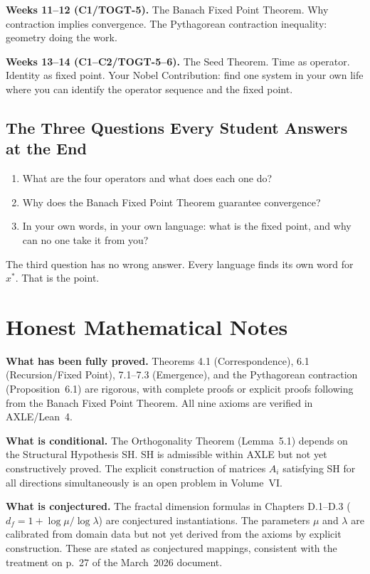 \documentclass[12pt, openright]{book}
\theoremstyle{definition}
\theoremstyle{remark}
\begin{document}
\textbf{Weeks 11--12 (C1/TOGT-5).}
The Banach Fixed Point Theorem. Why contraction implies convergence.
The Pythagorean contraction inequality: geometry doing the work.

\textbf{Weeks 13--14 (C1--C2/TOGT-5--6).}
The Seed Theorem. Time as operator. Identity as fixed point.
Your Nobel Contribution: find one system in your own life
where you can identify the operator sequence and the fixed point.

\section{The Three Questions Every Student Answers at the End}

\begin{enumerate}
\item What are the four operators and what does each one do?
\item Why does the Banach Fixed Point Theorem guarantee convergence?
\item In your own words, in your own language:
what is the fixed point, and why can no one take it from you?
\end{enumerate}

The third question has no wrong answer.
Every language finds its own word for $x^*$.
That is the point.

\backmatter

\chapter*{Honest Mathematical Notes}

\textbf{What has been fully proved.}
Theorems 4.1 (Correspondence), 6.1 (Recursion/Fixed Point),
7.1--7.3 (Emergence), and the Pythagorean contraction
(Proposition~6.1) are rigorous, with complete proofs
or explicit proofs following from the Banach Fixed Point Theorem.
All nine axioms are verified in AXLE/Lean~4.

\textbf{What is conditional.}
The Orthogonality Theorem (Lemma~5.1) depends on the
Structural Hypothesis SH. SH is admissible within AXLE
but not yet constructively proved. The explicit construction
of matrices $A_i$ satisfying SH for all directions simultaneously
is an open problem in Volume~VI.

\textbf{What is conjectured.}
The fractal dimension formulas in Chapters D.1--D.3
($d_f = 1 + \log\mu/\log\lambda$) are conjectured instantiations.
The parameters $\mu$ and $\lambda$ are calibrated from domain data
but not yet derived from the axioms by explicit construction.
These are stated as conjectured mappings, consistent with the
treatment on p.~27 of the March~2026 document.
\end{document}
